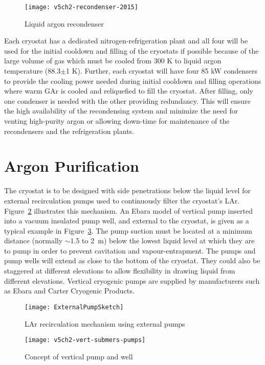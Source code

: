 \begin{figure}[htbp]
\centering
\texttt{[image: v5ch2-recondenser-2015]}
\caption{Liquid argon recondenser}
\label{fig:v5ch2-recondenser-sept-2011}
\end{figure}

Each cryostat has a dedicated nitrogen-refrigeration plant 
and all four will be used for the initial cooldown and filling of the 
cryostats if possible because of the large volume of 
gas which must be cooled from 300 K to liquid
argon temperature (88.3$\pm$1 K). Further, each cryostat will
have four 85 kW condensers to 
provide the cooling power needed during initial 
cooldown and filling operations where warm GAr
is cooled and reliquefied to fill the cryostat.
After filling, only one condenser is needed with the
other providing redundancy.
This will ensure the high availability of the recondensing 
system and minimize the need for venting high-purity argon 
or allowing down-time for maintenance of
the recondensers and the refrigeration plants. 

\section{Argon Purification}
\label{subsec:argon-pur}
The cryostat is to be designed with side penetrations below the liquid level 
for external recirculation pumps used to continuously filter the cryostat's 
LAr. Figure~\ref{fig:external-pump} illustrates this mechanism. An Ebara 
model of vertical pump inserted into a vacuum insulated pump well, and 
external to the cryostat, is given 
as a typical example in Figure~\ref{fig:vert-submers-pumps}. The pump suction 
must be located at a minimum distance (normally $\sim$1.5 to 2~m) below 
the lowest liquid level at which they are to pump in order to prevent 
cavitation and vapour-entrapment. The pumps and pump wells will extend 
as close to the bottom of the cryostat.  They 
could also be staggered at different elevations to allow flexibility 
in drawing liquid from different 
elevations. Vertical cryogenic pumps are supplied by manufacturers 
such as Ebara and Carter Cryogenic Products. 

\begin{figure}[htbp]
\centering
\texttt{[image: ExternalPumpSketch]}
\caption{LAr recirculation mechanism using external pumps}
\label{fig:external-pump}
\end{figure}

\begin{figure}[htbp]
\centering
\texttt{[image: v5ch2-vert-submers-pumps]}
\caption{Concept of vertical pump and well}
\label{fig:vert-submers-pumps}
\end{figure}

